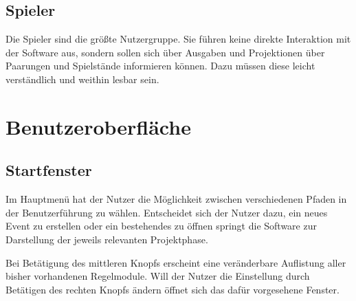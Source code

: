 \documentclass[11pt]{article}
\begin{document}
\subsection{Spieler}

Die Spieler sind die größte Nutzergruppe. Sie führen keine direkte Interaktion mit der Software aus, sondern sollen sich über Ausgaben und Projektionen über Paarungen und Spielstände informieren können. Dazu müssen diese leicht verständlich und weithin lesbar sein.

\newpage

\section{Benutzeroberfläche}

\subsection{Startfenster}


\vspace{1cm}

Im Hauptmenü hat der Nutzer die Möglichkeit zwischen verschiedenen Pfaden in der Benutzerführung zu wählen.
Entscheidet sich der Nutzer dazu, ein neues Event zu erstellen oder ein bestehendes zu öffnen springt die Software zur Darstellung der jeweils relevanten Projektphase.

Bei Betätigung des mittleren Knopfs erscheint eine veränderbare Auflistung aller bisher vorhandenen Regelmodule.
Will der Nutzer die Einstellung durch Betätigen des rechten Knopfs ändern öffnet sich das dafür vorgesehene Fenster.
\end{document}
